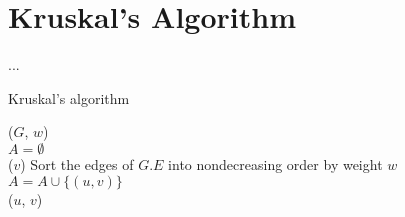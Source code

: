 \newpage
\section{Kruskal's Algorithm}
... \\
\begin{algorithm}[H]
	\caption{Kruskal's algorithm}
	\label{alg:kruskal-mst}
	
	
	
	
	\BlankLine
	\KruskalMST($G$, $w$) \\
	\Begin
	{
		$A = \emptyset$ \\
		{
			\MakeSet($v$)
		}
		Sort the edges of $G.E$ into nondecreasing order by weight $w$ \\
		
		{
			{
				$A = A \cup \{(u, v)\}$ \\
				\Union($u$, $v$)
			}
		}
	}
\end{algorithm}


\newpage
